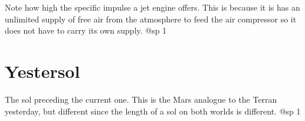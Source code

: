 Note how high the specific impulse a jet engine offers. This is because it is has an unlimited supply of free air from the atmosphere to feed the air compressor so it does not have to carry its own supply.
@sp 1

\section{Yestersol}
The sol preceding the current one. This is the Mars analogue to the Terran yesterday, but different since the length of a sol on both worlds is different.
@sp 1

